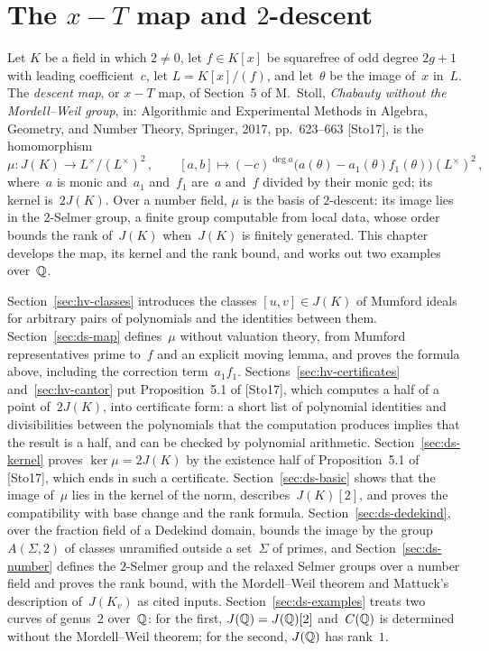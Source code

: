 \chapter{The \texorpdfstring{$x - T$}{x − T} map and \texorpdfstring{$2$}{2}-descent}
\label{ch:descent}

Let $K$ be a field in which $2 \ne 0$, let $f \in K[x]$ be squarefree of odd degree $2g + 1$ with
leading coefficient~$c$, let $L = K[x]/(f)$, and let~$\theta$ be the image of~$x$ in~$L$. The
\emph{descent map}, or $x - T$ map, of Section~5 of M.~Stoll, \emph{Chabauty without the
Mordell--Weil group}, in: Algorithmic and Experimental Methods in Algebra, Geometry, and Number
Theory, Springer, 2017, pp.~623--663 [Sto17], is the homomorphism
\[ \mu \colon J(K) \to L^\times/(L^\times)^2\,, \qquad
   [a, b] \mapsto (-c)^{\deg a}\bigl(a(\theta) - a_1(\theta) f_1(\theta)\bigr)(L^\times)^2\,, \]
where~$a$ is monic and~$a_1$ and~$f_1$ are~$a$ and~$f$ divided by their monic gcd; its kernel
is~$2J(K)$. Over a number field, $\mu$ is the basis of $2$-descent: its image lies in the
$2$-Selmer group, a finite group computable from local data, whose order bounds the rank
of~$J(K)$ when~$J(K)$ is finitely generated. This chapter develops the map, its kernel and the
rank bound, and works out two examples over~$\mathbb{Q}$.

Section~\ref{sec:hv-classes} introduces the classes $[u, v] \in J(K)$ of Mumford ideals for
arbitrary pairs of polynomials and the identities between them. Section~\ref{sec:ds-map}
defines~$\mu$ without valuation theory, from Mumford representatives prime to~$f$ and an explicit
moving lemma, and proves the formula above, including the correction term~$a_1 f_1$.
Sections~\ref{sec:hv-certificates} and~\ref{sec:hv-cantor} put Proposition~5.1 of [Sto17], which
computes a half of a point of~$2J(K)$, into certificate form: a short list of polynomial
identities and divisibilities between the polynomials that the computation produces implies that
the result is a half, and can be checked by polynomial arithmetic. Section~\ref{sec:ds-kernel}
proves $\ker\mu = 2J(K)$ by the existence half of Proposition~5.1 of [Sto17], which ends in such a
certificate. Section~\ref{sec:ds-basic} shows that the image of~$\mu$ lies in the kernel of the
norm, describes~$J(K)[2]$, and proves the compatibility with base change and the rank formula.
Section~\ref{sec:ds-dedekind}, over the fraction field of a Dedekind domain, bounds the image by
the group $A(\Sigma, 2)$ of classes unramified outside a set~$\Sigma$ of primes, and
Section~\ref{sec:ds-number} defines the $2$-Selmer group and the relaxed Selmer groups over a
number field and proves the rank bound, with the Mordell--Weil theorem and Mattuck's description
of~$J(K_v)$ as cited inputs. Section~\ref{sec:ds-examples} treats two curves of genus~$2$
over~$\mathbb{Q}$: for the first, $J(\mathbb{Q}) = J(\mathbb{Q})[2]$ and~$C(\mathbb{Q})$ is determined without the
Mordell--Weil theorem; for the second, $J(\mathbb{Q})$ has rank~$1$.

